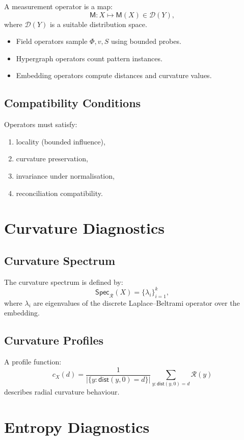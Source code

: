 A measurement operator is a map:
\[
\mathsf{M} : X \mapsto \mathsf{M}(X) \in \mathcal{D}(Y),
\]
where $\mathcal{D}(Y)$ is a suitable distribution space.

\begin{itemize}
\item Field operators sample $\Phi,v,S$ using bounded probes.
\item Hypergraph operators count pattern instances.
\item Embedding operators compute distances and curvature values.
\end{itemize}

\subsection{Compatibility Conditions}

Operators must satisfy:
\begin{enumerate}
\item locality (bounded influence),
\item curvature preservation,
\item invariance under normalisation,
\item reconciliation compatibility.
\end{enumerate}

\section{Curvature Diagnostics}

\subsection{Curvature Spectrum}

The curvature spectrum is defined by:
\[
\mathsf{Spec}_{\mathcal{R}}(X) = \{ \lambda_i \}_{i=1}^k,
\]
where $\lambda_i$ are eigenvalues of the discrete Laplace–Beltrami operator over the embedding.

\subsection{Curvature Profiles}

A profile function:
\[
c_X(d) = \frac{1}{|\{y : \mathsf{dist}(y,0)=d\}|}
          \sum_{y : \mathsf{dist}(y,0)=d}
          \mathcal{R}(y)
\]
describes radial curvature behaviour.

\section{Entropy Diagnostics}


